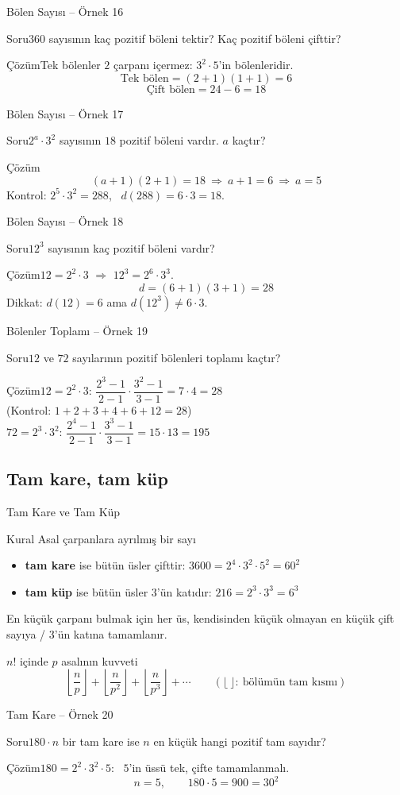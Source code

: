 \documentclass[aspectratio=169,11pt,handout]{beamer}
\newcommand{\soru}[3]{%
\begin{frame}{#1}
  \begin{block}{Soru}\large #2\end{block}
  \pause
  \begin{exampleblock}{Çözüm}\large #3\end{exampleblock}
\end{frame}}
\begin{document}
\soru{Bölen Sayısı -- Örnek 16}
{\(360\) sayısının kaç pozitif böleni tektir? Kaç pozitif böleni çifttir?}
{Tek bölenler \(2\) çarpanı içermez: \(3^2\cdot 5\)'in bölenleridir.
\[\text{Tek bölen}=(2+1)(1+1)=6\]
\[\text{Çift bölen}=24-6=18\]}

\soru{Bölen Sayısı -- Örnek 17}
{\(2^a\cdot 3^2\) sayısının \(18\) pozitif böleni vardır. \(a\) kaçtır?}
{\[(a+1)(2+1)=18\ \Rightarrow\ a+1=6\ \Rightarrow\ a=5\]
Kontrol: \(2^5\cdot 3^2=288\), \ \(d(288)=6\cdot 3=18\).}

\soru{Bölen Sayısı -- Örnek 18}
{\(12^3\) sayısının kaç pozitif böleni vardır?}
{\(12=2^2\cdot 3\) \(\Rightarrow\) \(12^3=2^6\cdot 3^3\).
\[d=(6+1)(3+1)=28\]
Dikkat: \(d(12)=6\) ama \(d(12^3)\neq 6\cdot 3\).}

\soru{Bölenler Toplamı -- Örnek 19}
{\(12\) ve \(72\) sayılarının pozitif bölenleri toplamı kaçtır?}
{\(12=2^2\cdot 3\): \quad \(\dfrac{2^3-1}{2-1}\cdot\dfrac{3^2-1}{3-1}=7\cdot 4=28\)\\[2pt]
{\normalsize (Kontrol: \(1+2+3+4+6+12=28\))}\\[4pt]
\(72=2^3\cdot 3^2\): \quad \(\dfrac{2^4-1}{2-1}\cdot\dfrac{3^3-1}{3-1}=15\cdot 13=195\)}

\subsection{Tam kare, tam küp}
\begin{frame}{Tam Kare ve Tam Küp}
\begin{block}{Kural}
Asal çarpanlara ayrılmış bir sayı
\begin{itemize}
\item \textbf{tam kare} ise bütün üsler çifttir: \(3600=2^4\cdot 3^2\cdot 5^2=60^2\)
\item \textbf{tam küp} ise bütün üsler \(3\)'ün katıdır: \(216=2^3\cdot 3^3=6^3\)
\end{itemize}
En küçük çarpanı bulmak için her üs, kendisinden küçük olmayan en küçük çift sayıya / \(3\)'ün katına tamamlanır.
\end{block}
\begin{block}{\(n!\) içinde \(p\) asalının kuvveti}
\[\left\lfloor\frac{n}{p}\right\rfloor+\left\lfloor\frac{n}{p^2}\right\rfloor+\left\lfloor\frac{n}{p^3}\right\rfloor+\cdots\qquad(\lfloor\ \rfloor:\ \text{bölümün tam kısmı})\]
\end{block}
\end{frame}

\soru{Tam Kare -- Örnek 20}
{\(180\cdot n\) bir tam kare ise \(n\) en küçük hangi pozitif tam sayıdır?}
{\(180=2^2\cdot 3^2\cdot 5\): \ \(5\)'in üssü tek, çifte tamamlanmalı.
\[n=5,\qquad 180\cdot 5=900=30^2\]}
\end{document}
